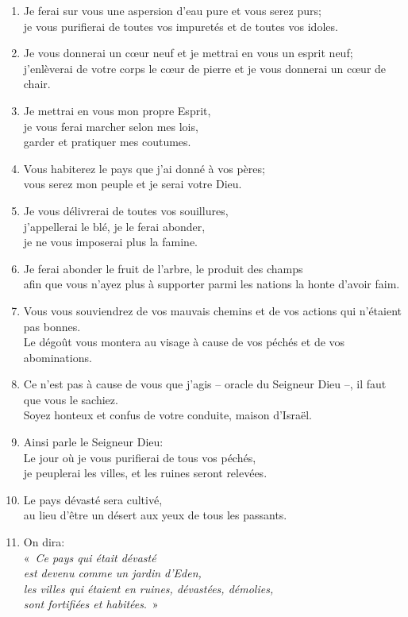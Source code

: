 \begin{enumerate}[leftmargin=\psleftmargin, labelsep = \pslabelsep, label={\arabic*}, font=\color{\pscolor}\small\textsuperscript, parsep=0em, itemsep=0em, topsep=0em ]
\item Je ferai sur vous une aspersion d’eau pure et vous serez purs; \\ je vous purifierai de toutes vos impuretés et de toutes vos idoles.
\item Je vous donnerai un cœur neuf et je mettrai en vous un esprit neuf; \\ j’enlèverai de votre corps le cœur de pierre et je vous donnerai un cœur de chair.
\item Je mettrai en vous mon propre Esprit, \\ je vous ferai marcher selon mes lois, \\ garder et pratiquer mes coutumes.
\item Vous habiterez le pays que j’ai donné à vos pères; \\ vous serez mon peuple et je serai votre Dieu.
\item Je vous délivrerai de toutes vos souillures, \\ j’appellerai le blé, je le ferai abonder, \\ je ne vous imposerai plus la famine.
\item Je ferai abonder le fruit de l’arbre, le produit des champs \\ afin que vous n’ayez plus à supporter parmi les nations la honte d’avoir faim.
\item Vous vous souviendrez de vos mauvais chemins et de vos actions qui n’étaient pas bonnes. \\ Le dégoût vous montera au visage à cause de vos péchés et de vos abominations.
\item Ce n’est pas à cause de vous que j’agis – oracle du Seigneur Dieu –, il faut que vous le sachiez. \\ Soyez honteux et confus de votre conduite, maison d’Israël. \parSpace
\item Ainsi parle le Seigneur Dieu: \\ Le jour où je vous purifierai de tous vos péchés, \\ je peuplerai les villes, et les ruines seront relevées.
\item Le pays dévasté sera cultivé, \\ au lieu d’être un désert aux yeux de tous les passants.
\item On dira: \\ \decalage «~\textit{Ce pays qui était dévasté \\ \decalage est devenu comme un jardin d’Eden, \\\decalage les villes qui étaient en ruines, dévastées, démolies, \\ \decalage sont fortifiées et habitées}.~»

\end{enumerate}
